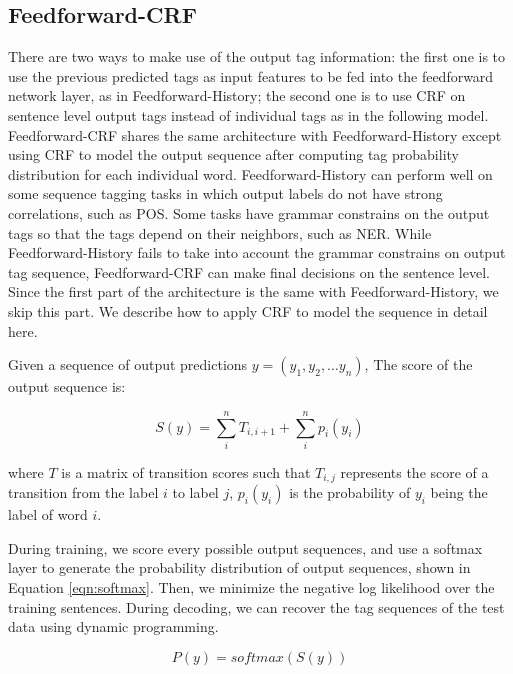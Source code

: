 \subsection{Feedforward-CRF}
\label{Feedforward-CRF}
There are two ways to make use of the output tag information: the first one is to use the previous predicted tags as input features to be fed into the feedforward network layer, as in Feedforward-History; the second one is to use CRF on sentence level output tags instead of individual tags as in the following model. Feedforward-CRF shares the same architecture with Feedforward-History except using CRF to model the output sequence after computing tag probability distribution for each individual word. Feedforward-History can perform well on some sequence tagging tasks in which output labels do not have strong correlations, such as POS. Some tasks have grammar constrains on the output tags so that the tags depend on their neighbors, such as NER. While Feedforward-History fails to take into account the grammar constrains on output tag sequence, Feedforward-CRF can make final decisions on the sentence level. Since the first part of the architecture is the same with Feedforward-History, we skip this part. We describe how to apply CRF to model the sequence in detail here.

Given a sequence of output predictions $y=\left( y_{1},y_{2},\ldots y_{n}\right)$,
The score of the output sequence is:

\begin{equation}
S\left( y\right)=\sum _{i}^{n}T_{i,i+1}+\sum _{i}^{n}p_{i}\left(y_{i}\right)
\end{equation}

where $T$ is a matrix of transition scores such that $T_{i,j}$ represents the score of a transition from the label $i$ to label $j$, $p_{i}\left(y_{i}\right)$ is the probability of $y_{i}$ being the label of word $i$.

During training, we score every possible output sequences, and use a softmax layer to generate the probability distribution of output sequences, shown in Equation \ref{eqn:softmax}. Then, we minimize the negative log likelihood over the training sentences. During decoding, we can recover the tag sequences of the test data using dynamic programming.

\begin{equation}\label{eqn:softmax}
P\left( y\right) = softmax(S\left( y\right))
\end{equation}


